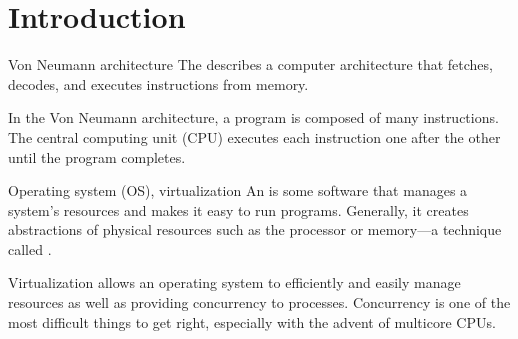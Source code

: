 \chapter{Introduction}

\begin{dfnbox}{Von Neumann architecture}{}
    The  describes a computer architecture that fetches, decodes, and executes instructions from memory.
\end{dfnbox}

In the Von Neumann architecture, a program is composed of many instructions. The central computing unit (CPU) executes each instruction one after the other until the program completes.

\begin{dfnbox}{Operating system (OS), virtualization}{}
    An  is some software that manages a system's resources and makes it easy to run programs. Generally, it creates abstractions of physical resources such as the processor or memory---a technique called .
\end{dfnbox}

Virtualization allows an operating system to efficiently and easily manage resources as well as providing concurrency to processes. Concurrency is one of the most difficult things to get right, especially with the advent of multicore CPUs.
